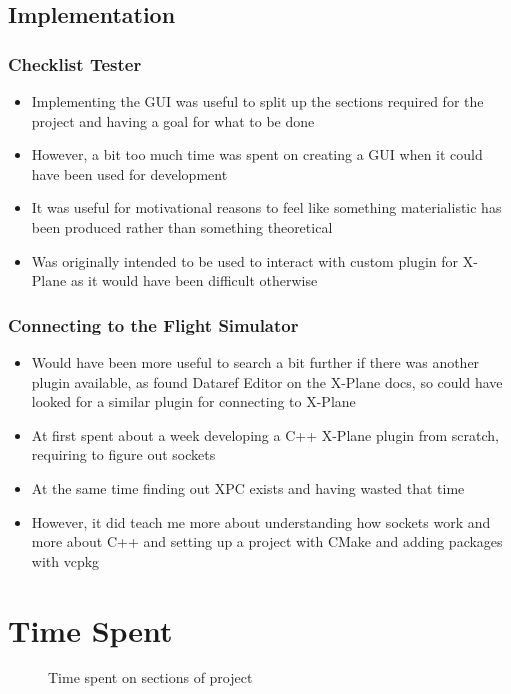 \documentclass[../dissertation.tex]{subfiles}
\begin{document}
\subsection{Implementation}

\subsubsection{Checklist Tester}
\begin{itemize}
  \item Implementing the GUI was useful to split up the sections required
    for the project and having a goal for what to be done
  \item However, a bit too much time was spent on creating a GUI when it
    could have been used for development
  \item It was useful for motivational reasons to feel like something
    materialistic has been produced rather than something theoretical
  \item Was originally intended to be used to interact with custom
    plugin for X-Plane as it would have been difficult otherwise
\end{itemize}

\subsubsection{Connecting to the Flight Simulator}
\begin{itemize}
  \item Would have been more useful to search a bit further if there was
    another plugin available, as found Dataref Editor on the X-Plane docs,
    so could have looked for a similar plugin for connecting to X-Plane
  \item At first spent about a week developing a C++ X-Plane plugin from scratch,
    requiring to figure out sockets
  \item At the same time finding out XPC exists and having wasted that time
  \item However, it did teach me more about understanding how sockets work and
    more about C++ and setting up a project with CMake and adding packages with
    vcpkg
\end{itemize}

\section{Time Spent}
\begin{figure}[h!]
  \centering
  \caption{Time spent on sections of project}
\end{figure}
\end{document}
